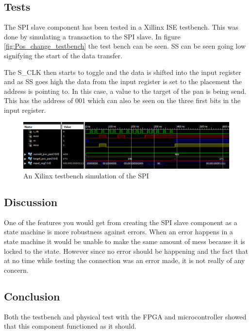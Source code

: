 \subsection{Tests}

The SPI slave component has been tested in a Xillinx ISE testbench. This was done by simulating a transaction to the SPI slave. In figure \ref{fig:Pos_change_testbench} the test bench can be seen. SS can be seen going low signifying the start of the data transfer.

\newpage

The S\_CLK then starts to toggle and the data is shifted into the input register and as SS goes high the data from the input register is set to the placement the address is pointing to. In this case, a value to the target of the pan is being send. This has the address of 001 which can also be seen on the three first bits in the input register.

\begin{figure}[h!]
\centering
\includegraphics[scale=0.5]{Billeder/FPGA/SPI_Slave/Testbench_of_SPI.png}
\caption{ An Xilinx testbench simulation of the SPI }
\label{fig:Testbench_of_SPI}
\end{figure}

\subsection{Discussion}

One of the features you would get from creating the SPI slave component as a state machine is more robustness against errors. When an error happens in a state machine it would be unable to make the same amount of mess because it is locked to the state. However since no error should be happening and the fact that at no time while testing the connection was an error made, it is not really of any concern.

\subsection{Conclusion}

Both the testbench and physical test with the FPGA and microcontroller showed that this component functioned as it should.